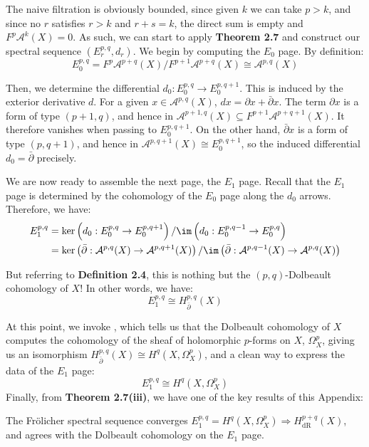 \medskip

\noindent The naive filtration is obviously bounded, since given $k$ we can take $p>k$, and since no $r$ satisfies $r>k$ and $r+s=k$, the direct sum is empty and $F^p\mathcal{A}^k(X) = 0$. As such, we can start to apply \textbf{Theorem 2.7} and construct our spectral sequence $\left(E_r^{p,q}, d_r\right)$. We begin by computing the $E_0$ page. By definition:
$$
E_0^{p,q} = F^p\mathcal{A}^{p+q}(X) / F^{p+1}\mathcal{A}^{p+q}(X) \cong  \mathcal{A}^{p,q}(X)
$$

\noindent Then, we determine the differential $d_0:E_0^{p,q} \to E_0^{p,q+1}$. This is induced by the exterior derivative $d$. For a given $x\in \mathcal{A}^{p,q}(X)$, $dx = \partial x  + \bar\partial x$. The term $\partial x$ is a form of type $(p+1,q)$, and hence in $\mathcal{A}^{p+1,q}(X) \subseteq F^{p+1}\mathcal{A}^{p+q+1}(X)$. It therefore vanishes when passing to $E_0^{p,q+1}$. On the other hand, $\bar\partial x$ is a form of type $(p,q+1)$, and hence in $\mathcal{A}^{p,q+1}(X) \cong E_0^{p,q+1}$, so the induced differential $d_0 = \bar\partial$ precisely. 

\medskip

\noindent We are now ready to assemble the next page, the $E_1$ page. Recall that the $E_1$ page is determined by the cohomology of the $E_0$ page along the $d_0$ arrows. Therefore, we have:
\begin{align*}
E_1^{p,q} &= \ker \left(d_0:E_0^{p,q} \to E_0^{p,q+1}\right) / \im \left(d_0: E_0^{p,q-1}\to E_0^{p,q}\right) \\
&= \ker\left(\bar\partial: \mathcal{A}^{p,q}(X)\to \mathcal{A}^{p,q+1}(X) \right) / \im \left(\bar\partial: \mathcal{A}^{p,q-1}(X)\to \mathcal{A}^{p,q}(X) \right)
\end{align*}

\noindent But referring to \textbf{Definition 2.4}, this is nothing but the $(p,q)$-Dolbeault cohomology of $X$! In other words, we have:
$$
E_1^{p,q} \cong H_{\bar\partial}^{p,q}(X)
$$

\noindent At this point, we invoke \cite[Corollary 2.6.21]{Huybrechts2005}, which tells us that the Dolbeault cohomology of $X$ computes the cohomology of the sheaf of holomorphic $p$-forms on $X$, $\Omega_X^p$, giving us an isomorphism $H_{\bar\partial}^{p,q}(X)\cong H^q\left(X,\Omega_X^p\right)$, and a clean way to express the data of the $E_1$ page:
$$
E_1^{p,q} \cong H^q\left(X,\Omega_X^p\right)
$$
Finally, from \textbf{Theorem 2.7(iii)}, we have one of the key results of this Appendix:
\begin{theorem}
    The Fr\"olicher spectral sequence converges $E_1^{p,q} = H^q\left(X,\Omega_X^p\right) \Rightarrow H^{p+q}_\mathrm{dR}(X)$, and agrees with the Dolbeault cohomology on the $E_1$ page. 
\end{theorem}

